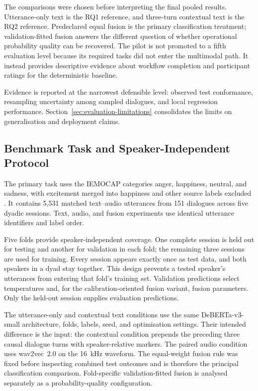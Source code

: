 The comparisons were chosen before interpreting the final pooled results. Utterance-only text is the RQ1 reference, and three-turn contextual text is the RQ2 reference. Predeclared equal fusion is the primary classification treatment; validation-fitted fusion answers the different question of whether operational probability quality can be recovered. The pilot is not promoted to a fifth evaluation level because its required tasks did not enter the multimodal path. It instead provides descriptive evidence about workflow completion and participant ratings for the deterministic baseline.

Evidence is reported at the narrowest defensible level: observed test conformance, resampling uncertainty among sampled dialogues, and local regression performance. Section~\ref{sec:evaluation-limitations} consolidates the limits on generalisation and deployment claims.

\subsection{Benchmark Task and Speaker-Independent Protocol}
\label{subsec:evaluation-benchmark-splits}

The primary task uses the IEMOCAP categories anger, happiness, neutral, and sadness, with excitement merged into happiness and other source labels excluded \cite{busso2008iemocap}. It contains 5,531 matched text--audio utterances from 151 dialogues across five dyadic sessions. Text, audio, and fusion experiments use identical utterance identifiers and label order.

Five folds provide speaker-independent coverage. One complete session is held out for testing and another for validation in each fold; the remaining three sessions are used for training. Every session appears exactly once as test data, and both speakers in a dyad stay together. This design prevents a tested speaker's utterances from entering that fold's training set. Validation predictions select temperatures and, for the calibration-oriented fusion variant, fusion parameters. Only the held-out session supplies evaluation predictions.

The utterance-only and contextual text conditions use the same DeBERTa-v3-small architecture, folds, labels, seed, and optimisation settings. Their intended difference is the input: the contextual condition prepends the preceding three causal dialogue turns with speaker-relative markers. The paired audio condition uses wav2vec~2.0 on the 16~kHz waveform. The equal-weight fusion rule was fixed before inspecting combined test outcomes and is therefore the principal classification comparison. Fold-specific validation-fitted fusion is analysed separately as a probability-quality configuration.

